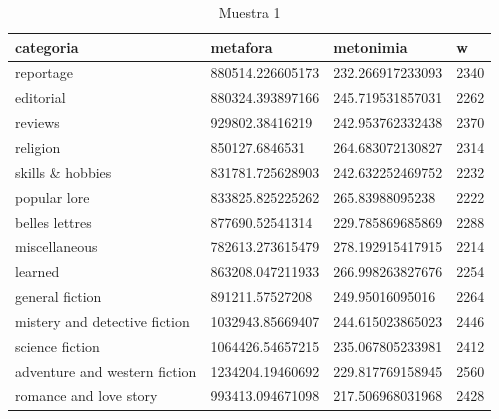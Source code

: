 \documentclass[twoside]{article}
\begin{document}
\begin{center}
    \begin{longtable}{| p{} | p{} | p{}|p{}|}
    \caption{Muestra 1}
    \hline
        categoria & metafora & metonimia & w \\ \hline
        reportage & 880514.226605173 & 232.266917233093 & 2340 \\ \hline
        editorial & 880324.393897166 & 245.719531857031 & 2262 \\ \hline
        reviews & 929802.38416219 & 242.953762332438 & 2370 \\ \hline
        religion & 850127.6846531 & 264.683072130827 & 2314 \\ \hline
        skills \& hobbies & 831781.725628903 & 242.632252469752 & 2232 \\ \hline
        popular lore & 833825.825225262 & 265.83988095238 & 2222 \\ \hline
        belles lettres & 877690.52541314 & 229.785869685869 & 2288 \\ \hline
        miscellaneous & 782613.273615479 & 278.192915417915 & 2214 \\ \hline
        learned & 863208.047211933 & 266.998263827676 & 2254 \\ \hline
        general fiction & 891211.57527208 & 249.95016095016 & 2264 \\ \hline
        mistery and detective fiction & 1032943.85669407 & 244.615023865023 & 2446 \\ \hline
        science fiction & 1064426.54657215 & 235.067805233981 & 2412 \\ \hline
        adventure and western fiction & 1234204.19460692 & 229.817769158945 & 2560 \\ \hline
        romance and love story & 993413.094671098 & 217.506968031968 & 2428 \\ \hline
\end{longtable}
\label{muestra1}
\end{center}
\end{document}
